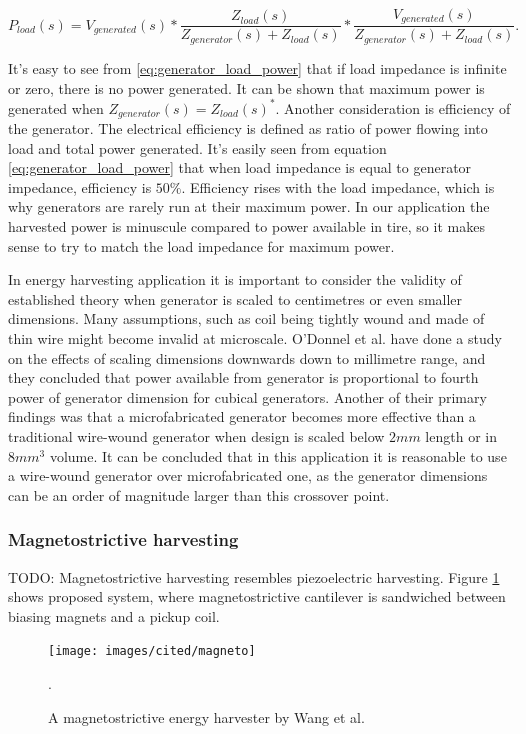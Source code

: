 \begin{equation} \label{eq:generator_load_power}
  P_{load}(s) = V_{generated}(s)*\frac{Z_{load}(s)}{Z_{generator}(s)+Z_{load}(s)}*\frac{V_{generated}(s)}{Z_{generator}(s)+Z_{load}(s)}.
\end{equation}

It's easy to see from \eqref{eq:generator_load_power} that if load impedance is infinite or zero, there is no power generated. It can be shown that maximum power is generated when $Z_{generator}(s) = {Z_{load}(s)}^*$. Another consideration is efficiency of the generator. The electrical efficiency is defined as ratio of power flowing into load and total power generated. It's easily seen from equation \eqref{eq:generator_load_power} that when load impedance is equal to generator impedance, efficiency is $ 50 \%$. Efficiency rises with the load impedance, which is why generators are rarely run at their maximum power. In our application the harvested power is minuscule compared to power available in tire, so it makes sense to try to match the load impedance for maximum power.

In energy harvesting application it is important to consider the validity of established theory when generator is scaled to centimetres or even smaller dimensions. Many assumptions, such as coil being tightly wound and made of thin wire might become invalid at microscale. O'Donnel et al. \cite{ODonnell2007} have done a study on the effects of scaling dimensions downwards down to millimetre range, and they concluded that power available from generator is proportional to fourth power of generator dimension for cubical generators. Another of their primary findings was that a microfabricated generator becomes more effective than a traditional wire-wound generator when design is scaled below $2 mm$ length or in $8 mm^3$ volume. It can be concluded that in this application it is reasonable to use a wire-wound generator over microfabricated one, as the generator dimensions can be an order of magnitude larger than this crossover point. 

\subsubsection{Magnetostrictive harvesting}
TODO: Magnetostrictive harvesting resembles piezoelectric harvesting. Figure \ref{magneto} shows proposed system, where magnetostrictive cantilever is sandwiched between biasing magnets and a pickup coil.  

\begin{figure}[htb]
\begin{center}
\texttt{[image: images/cited/magneto]}
\end{center}
\caption{A magnetostrictive energy harvester by Wang et al. \cite{Wang2006}}.
\label{magneto}
\end{figure}

